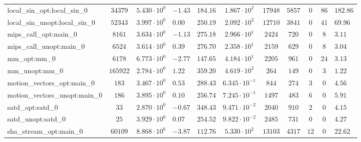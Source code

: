 \begin{tabular}{|l|c|HHc|c|c|c|c|cH|}
local\_sin\_opt:local\_sin\_0                   & $ 34379    $ & $ 5.430 \cdot 10^{0} $ & $ -1.43 $ & $ 184.16 $ & $ 1.867 \cdot 10^{2}  $ & $ 17948  $ & $ 5857  $ & $ 0   $ & $ 86  $ & $ 182.86  $ \\
local\_sin\_unopt:local\_sin\_0                 & $ 52343    $ & $ 3.997 \cdot 10^{0} $ & $ 0.00  $ & $ 250.19 $ & $ 2.092 \cdot 10^{2}  $ & $ 12710  $ & $ 3841  $ & $ 0   $ & $ 41  $ & $ 69.96   $ \\
mips\_call\_opt:main\_0                         & $ 8161     $ & $ 3.634 \cdot 10^{0} $ & $ -1.13 $ & $ 275.18 $ & $ 2.966 \cdot 10^{1}  $ & $ 2424   $ & $ 720   $ & $ 0   $ & $ 8   $ & $ 3.11    $ \\
mips\_call\_unopt:main\_0                       & $ 6524     $ & $ 3.614 \cdot 10^{0} $ & $ 0.39  $ & $ 276.70 $ & $ 2.358 \cdot 10^{1}  $ & $ 2159   $ & $ 629   $ & $ 0   $ & $ 8   $ & $ 3.04    $ \\
mm\_opt:mm\_0                                   & $ 6178     $ & $ 6.773 \cdot 10^{0} $ & $ -2.77 $ & $ 147.65 $ & $ 4.184 \cdot 10^{1}  $ & $ 2205   $ & $ 961   $ & $ 0   $ & $ 24  $ & $ 3.13    $ \\
mm\_unopt:mm\_0                                 & $ 165922   $ & $ 2.784 \cdot 10^{0} $ & $ 1.22  $ & $ 359.20 $ & $ 4.619 \cdot 10^{2}  $ & $ 264    $ & $ 149   $ & $ 0   $ & $ 3   $ & $ 1.22    $ \\
motion\_vectors\_opt:main\_0                    & $ 183      $ & $ 3.467 \cdot 10^{0} $ & $ 0.53  $ & $ 288.43 $ & $ 6.345 \cdot 10^{-1} $ & $ 844    $ & $ 274   $ & $ 3   $ & $ 0   $ & $ 4.56    $ \\
motion\_vectors\_unopt:main\_0                  & $ 186      $ & $ 3.895 \cdot 10^{0} $ & $ 0.10  $ & $ 256.74 $ & $ 7.245 \cdot 10^{-1} $ & $ 1497   $ & $ 483   $ & $ 6   $ & $ 0   $ & $ 5.91    $ \\
satd\_opt:satd\_0                               & $ 33       $ & $ 2.870 \cdot 10^{0} $ & $ -0.67 $ & $ 348.43 $ & $ 9.471 \cdot 10^{-2} $ & $ 2040   $ & $ 910   $ & $ 2   $ & $ 0   $ & $ 4.15    $ \\
satd\_unopt:satd\_0                             & $ 25       $ & $ 3.929 \cdot 10^{0} $ & $ 0.07  $ & $ 254.52 $ & $ 9.822 \cdot 10^{-2} $ & $ 2485   $ & $ 731   $ & $ 0   $ & $ 0   $ & $ 4.27    $ \\
sha\_stream\_opt:main\_0                        & $ 60109    $ & $ 8.868 \cdot 10^{0} $ & $ -3.87 $ & $ 112.76 $ & $ 5.330 \cdot 10^{2}  $ & $ 13103  $ & $ 4317  $ & $ 12  $ & $ 0   $ & $ 22.62   $ \\

\end{tabular}
